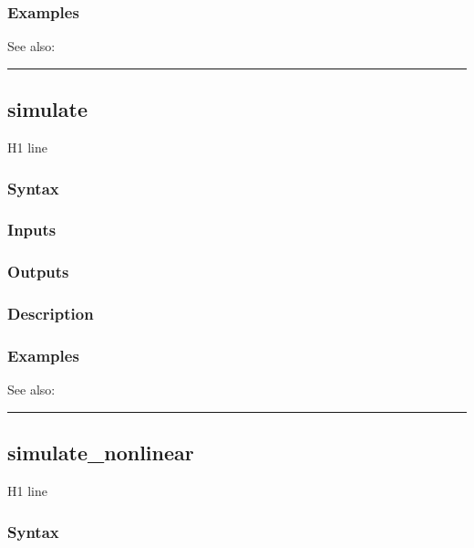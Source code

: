 \documentclass[letterpaper,10pt,english]{sphinxmanual}
\begin{document}
\subsubsection{Examples}
\label{classes/models/@dsge/dsge:id160}
See also:


\bigskip\hrule{}\bigskip



\subsection{simulate}
\label{classes/models/@dsge/dsge:id161}\label{classes/models/@dsge/dsge:simulate}
H1 line


\subsubsection{Syntax}
\label{classes/models/@dsge/dsge:id162}

\subsubsection{Inputs}
\label{classes/models/@dsge/dsge:id163}

\subsubsection{Outputs}
\label{classes/models/@dsge/dsge:id164}

\subsubsection{Description}
\label{classes/models/@dsge/dsge:id165}

\subsubsection{Examples}
\label{classes/models/@dsge/dsge:id166}
See also:


\bigskip\hrule{}\bigskip



\subsection{simulate\_nonlinear}
\label{classes/models/@dsge/dsge:id167}\label{classes/models/@dsge/dsge:simulate-nonlinear}
H1 line


\subsubsection{Syntax}
\label{classes/models/@dsge/dsge:id168}
\end{document}
